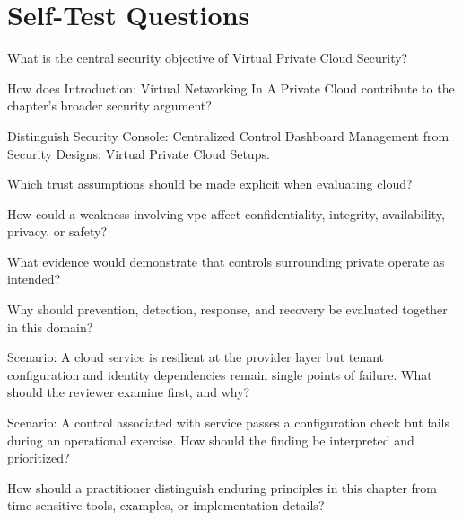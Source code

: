 \documentclass[11pt,letterpaper]{article}
\begin{document}
\section*{Self-Test Questions}
\begin{CornellRecallList}
\item What is the central security objective of Virtual Private Cloud Security?
\item How does Introduction: Virtual Networking In A Private Cloud contribute to the chapter's broader security argument?
\item Distinguish Security Console: Centralized Control Dashboard Management from Security Designs: Virtual Private Cloud Setups.
\item Which trust assumptions should be made explicit when evaluating cloud?
\item How could a weakness involving vpc affect confidentiality, integrity, availability, privacy, or safety?
\item What evidence would demonstrate that controls surrounding private operate as intended?
\item Why should prevention, detection, response, and recovery be evaluated together in this domain?
\item Scenario: A cloud service is resilient at the provider layer but tenant configuration and identity dependencies remain single points of failure. What should the reviewer examine first, and why?
\item Scenario: A control associated with service passes a configuration check but fails during an operational exercise. How should the finding be interpreted and prioritized?
\item How should a practitioner distinguish enduring principles in this chapter from time-sensitive tools, examples, or implementation details?
\end{CornellRecallList}
\end{document}
